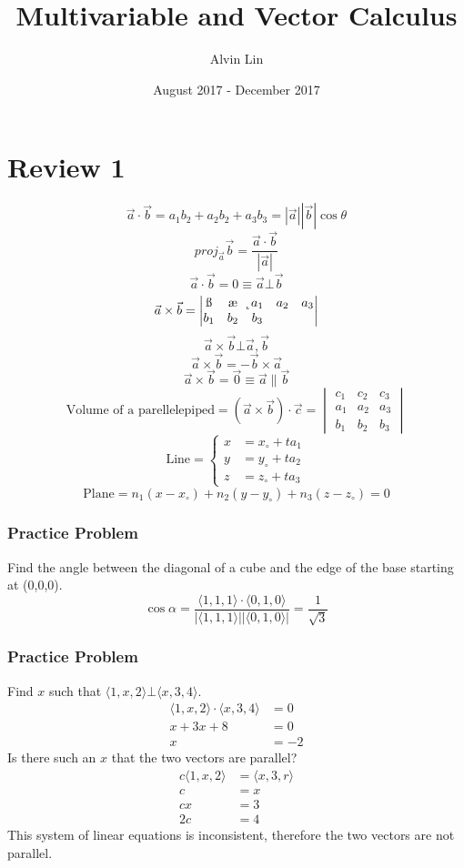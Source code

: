 \documentclass{math}
\title{Multivariable and Vector Calculus}
\author{Alvin Lin}
\date{August 2017 - December 2017}
\begin{document}
\maketitle

\section*{Review 1}
\[ \vec{a}\cdot\vec{b} = a_1b_2+a_2b_2+a_3b_3 =
  |\vec{a}||\vec{b}|\cos\theta \]
\[ proj_{\vec{a}}\vec{b} = \frac{\vec{a}\cdot\vec{b}}{|\vec{a}|} \]
\[ \vec{a}\cdot\vec{b} = 0 \equiv \vec{a}\bot\vec{b} \]
\[ \vec{a}\times\vec{b} = \begin{vmatrix}
  \i & \j & \k \\
  a_1 & a_2 & a_3 \\
  b_1 & b_2 & b_3
\end{vmatrix} \]
\[ \vec{a}\times\vec{b}\bot\vec{a},\vec{b} \]
\[ \vec{a}\times\vec{b} = -\vec{b}\times\vec{a} \]
\[ \vec{a}\times\vec{b} = \vec{0} \equiv \vec{a}\parallel\vec{b} \]
\[ \text{Volume of a parellelepiped} = (\vec{a}\times\vec{b})\cdot\vec{c} =
\begin{vmatrix}
  c_1 & c_2 & c_3 \\
  a_1 & a_2 & a_3 \\
  b_1 & b_2 & b_3
\end{vmatrix} \]
\[ \text{Line} = \begin{cases}
  x &= x_{\circ}+ta_1 \\
  y &= y_{\circ}+ta_2 \\
  z &= z_{\circ}+ta_3
\end{cases} \]
\[ \text{Plane} = n_1(x-x_{\circ})+n_2(y-y_{\circ})+n_3(z-z_{\circ}) = 0 \]

\subsubsection*{Practice Problem}
Find the angle between the diagonal of a cube and the edge of the base
starting at (0,0,0).
\[ \cos\alpha = \frac{\langle1,1,1\rangle\cdot\langle0,1,0\rangle}
  {|\langle1,1,1\rangle||\langle0,1,0\rangle|} = \frac{1}{\sqrt{3}} \]

\subsubsection*{Practice Problem}
Find \( x \) such that \( \langle1,x,2\rangle\bot\langle x,3,4\rangle \).
\begin{align*}
  \langle1,x,2\rangle\cdot\langle x,3,4\rangle &= 0 \\
  x+3x+8 &= 0 \\
  x &= -2
\end{align*}
Is there such an \( x \) that the two vectors are parallel?
\begin{align*}
  c\langle1,x,2\rangle &= \langle x,3,r\rangle \\
  c &= x \\
  cx &= 3 \\
  2c &= 4
\end{align*}
This system of linear equations is inconsistent, therefore the two vectors
are not parallel.
\end{document}
